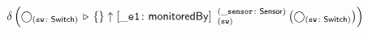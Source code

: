 \documentclass[varwidth=100cm,convert={density=120}]{standalone}
\begin{document}
\begin{preview}
$\duplicateelimination \left(\getvertices{sw}{Switch} \antijoin \{\} \expandout{\_e1}{monitoredBy}{sw}{\_sensor}{Sensor} \left(\getvertices{sw}{Switch}\right)\right)$
\end{preview}
\end{document}
